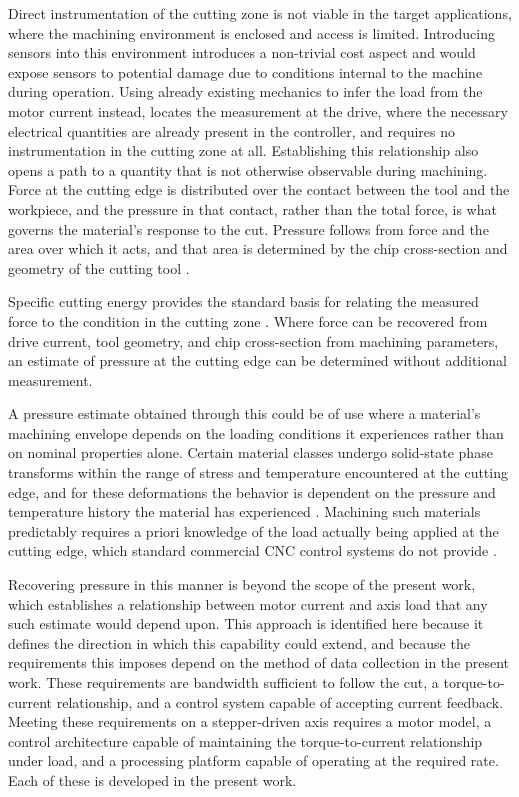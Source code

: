Direct instrumentation of the cutting zone is not viable in the target applications, where the machining environment is enclosed and access is limited. Introducing sensors into this environment introduces a non-trivial cost aspect and would expose sensors to potential damage due to conditions internal to the machine during operation\cite{wong_technical_2020}. Using already existing mechanics to infer the load from the motor current instead, locates the measurement at the drive, where the necessary electrical quantities are already present in the controller, and requires no instrumentation in the cutting zone at all. Establishing this relationship also opens a path to a quantity that is not otherwise observable during machining. Force at the cutting edge is distributed over the contact between the tool and the workpiece, and the pressure in that contact, rather than the total force, is what governs the material’s response to the cut. Pressure follows from force and the area over which it acts, and that area is determined by the chip cross-section and geometry of the cutting tool \cite{altintas_manufacturing_2012, civiello_characterization_2026}.

 Specific cutting energy provides the standard basis for relating the measured force to the condition in the cutting zone \cite{altintas_manufacturing_2012, groover_fundamentals_2010, civiello_characterization_2026}. Where force can be recovered from drive current, tool geometry, and chip cross-section from machining parameters, an estimate of pressure at the cutting edge can be determined without additional measurement.
 
A pressure estimate obtained through this could be of use where a material’s machining envelope depends on the loading conditions it experiences rather than on nominal properties alone. Certain material classes undergo solid-state phase transforms within the range of stress and temperature encountered at the cutting edge, and for these deformations the behavior is dependent on the pressure and temperature history the material has experienced \cite{woodrum_developing_2017}. Machining such materials predictably requires a priori knowledge of the load actually being applied at the cutting edge, which standard commercial CNC control systems do not provide \cite{teti_advanced_2010,woodrum_developing_2017}.


Recovering pressure in this manner is beyond the scope of the present work, which establishes a relationship between motor current and axis load that any such estimate would depend upon. This approach is identified here because it defines the direction in which this capability could extend, and because the requirements this imposes depend on the method of data collection in the present work. These requirements are bandwidth sufficient to follow the cut, a torque-to-current relationship, and a control system capable of accepting current feedback. Meeting these requirements on a stepper-driven axis requires a motor model, a control architecture capable of maintaining the torque-to-current relationship under load, and a processing platform capable of operating at the required rate. Each of these is developed in the present work. 

